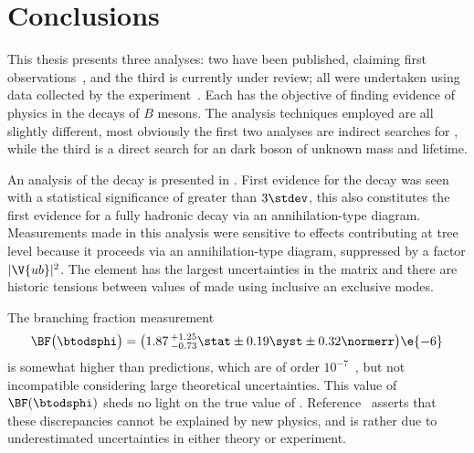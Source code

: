 \chapter{Conclusions}
\label{ch:conc}

This thesis presents three analyses: two have been published, claiming first
observations~\cite{LHCb-PAPER-2012-025,LHCb-PAPER-2014-030}, and the third is currently under
review; all were
undertaken using data collected by the \lhcb experiment~\cite{Alves:2008zz}.
Each has the objective of finding evidence of physics \bsm in the decays of $B$ mesons.
The analysis techniques employed are all slightly different, most obviously the first two analyses
are indirect searches for \np, while the third is a direct search for an dark boson of unknown mass
and lifetime.

An analysis of the decay \btodsphi is presented in .
First evidence for the decay was seen with a statistical significance of greater than $3\stdev$,
this also constitutes the first evidence for a fully hadronic decay via an annihilation-type
diagram.
Measurements made in this analysis were sensitive to \np effects contributing at tree
level because it proceeds via an annihilation-type diagram, suppressed by a factor $|\V{ub}|^2$.
The element  has the largest uncertainties in the \ckm matrix and there are historic tensions
between values of  made using inclusive an exclusive modes.


The branching fraction measurement
\begin{equation*}
  \BF\big(\btodsphi\big) =
  \big(1.87\,^{+1.25}_{-0.73}\stat\pm0.19\syst\pm0.32\normerr\big)\e{-6}
\end{equation*}
is somewhat higher than \sm predictions, which are
of order $10^{-7}$~\cite{Zou:2009zza,Mohanta:2002wf,PhysRevD.76.057701,Lu:2001yz}, but
not incompatible considering large theoretical uncertainties.
This value of $\BF(\btodsphi)$ sheds no light on the true value of .
Reference~\cite{Crivellin:2014zpa} asserts that these
discrepancies cannot be explained by new physics, and is rather due to underestimated uncertainties
in either theory or experiment.

